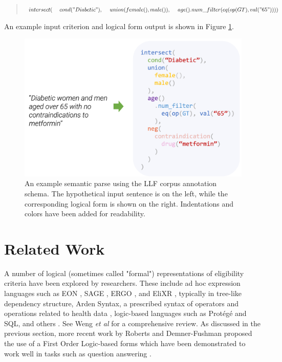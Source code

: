 \documentclass[../main.tex]{subfiles}
\begin{document}
\begin{quote}
$intersect( \\
    \mathrm{\ \ \ \ }cond("Diabetic"), \\
    \mathrm{\ \ \ \ }union(female(), male()),\\
    \mathrm{\ \ \ \ }age().num\_filter(eq(op(GT), val("65"))) \\
)$
\end{quote}

\noindent An example input criterion and logical form output is shown in Figure \ref{fig_semantic_parse}.

\begin{figure}[ht!]
  \centering
  \includegraphics[scale=0.6]{Figures/4_llf_corpus/semantic_parse.png}  
\caption{An example semantic parse using the LLF corpus annotation schema. The hypothetical input sentence is on the left, while the corresponding logical form is shown on the right. Indentations and colors have been added for readability.}
\label{fig_semantic_parse}
\end{figure}

\section{Related Work}

A number of logical (sometimes called "formal") representations of eligibility criteria have been explored by researchers. These include ad hoc expression languages such as EON \cite{musen1996eon}, SAGE \cite{tu2007sage}, ERGO \cite{sim2004ontology}, and EliXR \cite{weng2011elixr}, typically in tree-like dependency structure, Arden Syntax, a prescribed syntax of operators and operations related to health data \cite{hulse1976computerized}, logic-based languages such as Protégé \cite{musen2015protege} and SQL, and others \cite{sordo2004description,miksch1997asbru,o2002chronus}. See Weng \textit{et al} \cite{weng2010formal} for a comprehensive review. As discussed in the previous section, more recent work by Roberts and Demner-Fushman proposed the use of a First Order Logic-based forms \cite{roberts2016annotating} which have been demonstrated to work well in tasks such as question answering \cite{soni2023quehry}.
\end{document}
